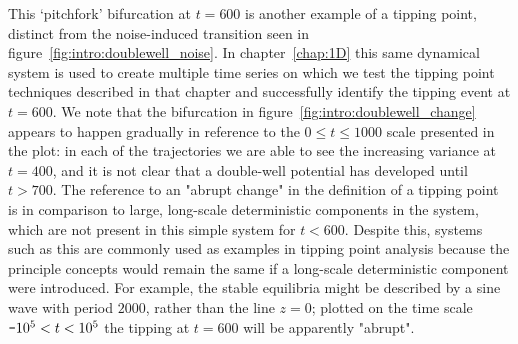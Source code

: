 {} This `pitchfork' bifurcation at $t=600$ is another example of a tipping point, distinct from the noise-induced transition seen in figure~\ref{fig:intro:doublewell_noise}. In chapter~\ref{chap:1D} this same dynamical system is used to create multiple time series on which we test the tipping point techniques described in that chapter and successfully identify the tipping event at $t=600$. We note that the bifurcation in figure~\ref{fig:intro:doublewell_change} appears to happen gradually in reference to the $0\leq t \leq 1000$ scale presented in the plot: in each of the trajectories we are able to see the increasing variance at $t=400$, and it is not clear that a double-well potential has developed until $t>700$. The reference to an "abrupt change" in the definition of a tipping point \citep{kuehn2011mathematical} is in comparison to large, long-scale deterministic components in the system, which are not present in this simple system for $t<600$. Despite this, systems such as this are commonly used as examples in tipping point analysis \citep{scheffer2009,kuehn2011mathematical} because the principle concepts would remain the same if a long-scale deterministic component were introduced. For example, the stable equilibria might be described by a sine wave with period $2000$, rather than the line $z=0$; plotted on the time scale $\textup{\texttt{-}} 10^5<t<10^5$ the tipping at $t=600$ will be apparently "abrupt".


